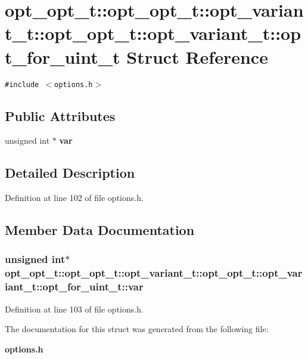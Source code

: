 \section{opt\_\-opt\_\-t::opt\_\-opt\_\-t::opt\_\-variant\_\-t::opt\_\-opt\_\-t::opt\_\-variant\_\-t::opt\_\-for\_\-uint\_\-t Struct Reference}
\label{structopt__opt__t_1_1opt__variant__t_1_1opt__for__uint__t}
{\tt \#include $<$options.h$>$}

\subsection*{Public Attributes}
\begin{CompactItemize}
\item 
unsigned int $\ast$ {\bf var}
\end{CompactItemize}


\subsection{Detailed Description}


Definition at line 102 of file options.h.

\subsection{Member Data Documentation}
\subsubsection[{var}]{\setlength{\rightskip}{0pt plus 5cm}unsigned int$\ast$ opt\_\-opt\_\-t::opt\_\-opt\_\-t::opt\_\-variant\_\-t::opt\_\-opt\_\-t::opt\_\-variant\_\-t::opt\_\-for\_\-uint\_\-t::var}\label{structopt__opt__t_1_1opt__variant__t_1_1opt__for__uint__t_913f4d6ab301e064b2163c09fcc9c5d7}




Definition at line 103 of file options.h.

The documentation for this struct was generated from the following file:\begin{CompactItemize}
\item 
{\bf options.h}\end{CompactItemize}
